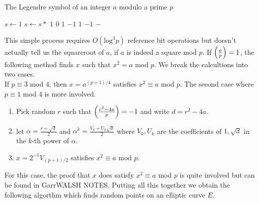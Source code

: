 \begin{algorithm} 
	\caption{The Legendre symbol of an integer $a$ modulo a prime $p$}
	\begin{algorithmic}[1]
			\State $s \leftarrow 1 $
				\State $s \leftarrow s * $
			\EndFor
			  		\State \Return $1$
			  		\State \Return $0$ 
			  			\State \Return $1$
			  		\Else
			  			\State \Return $-1$
			  		\EndIf
			  			\State \Return $1$
			  		\Else
			  			\State \Return $-1$
			  		\EndIf 
			  		\State \Return {} 
			  		\State \Return {}
			  	\Else
			  		\State \Return $-$
			  	\EndIf
		  	\EndFunction
		  	\State {}
		\EndFunction
	\end{algorithmic} 
\end{algorithm} 


This simple process requires $O(\text{log}^3p)$ {\color{red}  reference } bit operations but doesn't actually tell us the squareroot of $a$, if $a$ is indeed a square mod $p$. If $\left(\frac{a}{p}\right) = 1 $, the following method finds $x$ such that $x^2 = a$ mod $p$. We break the calcultions into two cases. \\

If $p \equiv 3 $ mod $4$, then $x = a^{(p+1)/4}$ satisfies $x^2 \equiv a $ mod $p$. The second case where $p \equiv 1 $ mod $4$ is more involved.

\begin{enumerate}[1.]
	\item Pick random $r$ such that $\left(\frac{r^2 - 4a}{p}\right) =  -1 $ and write $d = r^2 - 4a$.
	\item let $\alpha = \frac{r+\sqrt{d}}{2}$ and $\alpha^k = \frac{V_k + U_k \sqrt{d}}{2}$ where $V_k,U_k$ are the coefficients of $1, \sqrt{d}$ in the $k$-th power of $\alpha$. 
	\item $x =  2^{-1}V_{(p+1)/2}$ satisfies $x^2 \equiv a $ mod $p$. 
\end{enumerate}

For this case, the proof that $x$ does satisfy $x^2 \equiv a $ mod $p$ is quite involved but can be found in {\color{red} GarrWALSH NOTES}. Putting all this together we obtain the following algorthm which finds random points on an elliptic curve $E$. \\ 

